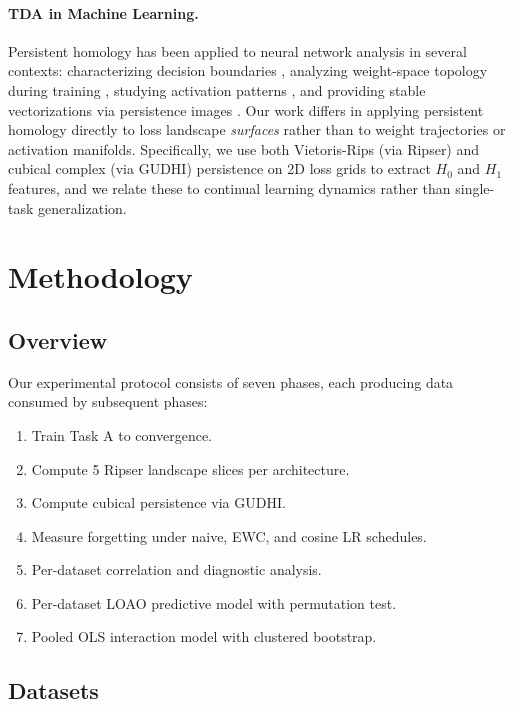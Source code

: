 \documentclass[10pt,twocolumn]{article}
\begin{document}
\paragraph{TDA in Machine Learning.}
Persistent homology has been applied to neural network analysis in several contexts: characterizing decision boundaries \citep{ramamurthy2019topological}, analyzing weight-space topology during training \citep{rieck2019neural}, studying activation patterns \citep{naitzat2020topology}, and providing stable vectorizations via persistence images \citep{adams2017persistence}. Our work differs in applying persistent homology directly to loss landscape \emph{surfaces} rather than to weight trajectories or activation manifolds. Specifically, we use both Vietoris-Rips (via Ripser) and cubical complex (via GUDHI) persistence on 2D loss grids to extract $H_0$ and $H_1$ features, and we relate these to continual learning dynamics rather than single-task generalization.

\section{Methodology}
\label{sec:method}

\subsection{Overview}

Our experimental protocol consists of seven phases, each producing data consumed by subsequent phases:
\begin{enumerate}
    \item[\textbf{P1.}] Train Task A to convergence.
    \item[\textbf{P2.}] Compute 5 Ripser landscape slices per architecture.
    \item[\textbf{P2c.}] Compute cubical persistence via GUDHI.
    \item[\textbf{P3.}] Measure forgetting under naive, EWC, and cosine LR schedules.
    \item[\textbf{P4.}] Per-dataset correlation and diagnostic analysis.
    \item[\textbf{P5.}] Per-dataset LOAO predictive model with permutation test.
    \item[\textbf{P6.}] Pooled OLS interaction model with clustered bootstrap.
\end{enumerate}

\subsection{Datasets}
\end{document}

